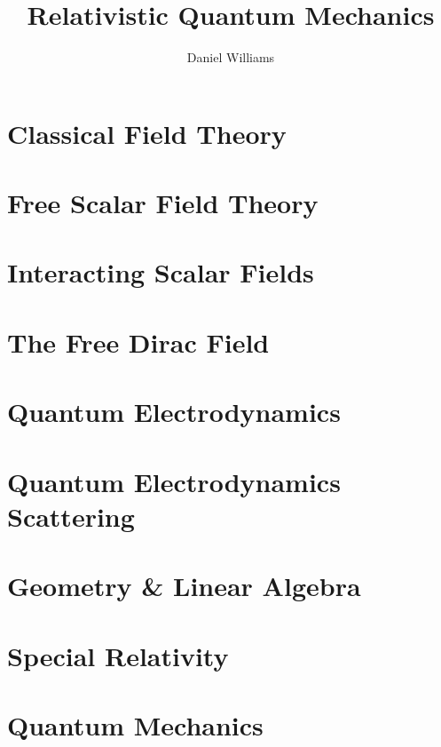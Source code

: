 \documentclass{momento}
\title{Relativistic Quantum Mechanics}
\author{Daniel Williams}
\begin{document}
\maketitle

\tableofcontents

\chapter{Classical Field Theory}
\label{cha:class-field-theory}



\chapter{Free Scalar Field Theory}
\label{cha:free-scalar-field}

\chapter{Interacting Scalar Fields}
\label{cha:inter-scal-fields}

\chapter{The Free Dirac Field}
\label{cha:free-dirac-field}

\chapter{Quantum Electrodynamics}
\label{cha:quant-electr}

\chapter{Quantum Electrodynamics Scattering}
\label{cha:quant-electr-scatt}



\appendices

\chapter{Geometry \& Linear Algebra}
\label{cha:linearalgebra}


\chapter{Special Relativity}
\label{cha:specialrelativity}



\chapter{Quantum Mechanics}
\label{cha:quantummechanics}


\end{document}
